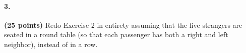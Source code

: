 \documentclass[11pt]{article} %
\begin{document}
 


























\paragraph{3.} \textbf{(25 points)} Redo Exercise 2 in entirety assuming that the five strangers are seated in a round table (so that each passenger has both a right and left neighbor), instead of in a row.\\
\end{document}
